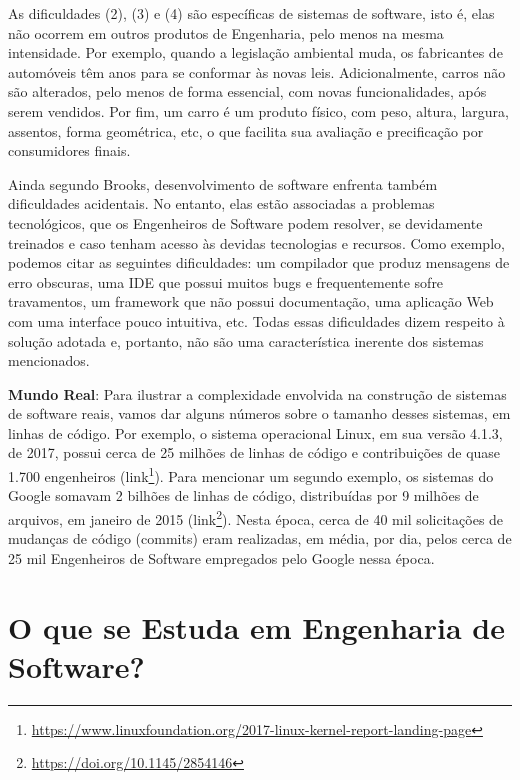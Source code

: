 \documentclass[
  11pt,
  twoside]{book}
\DeclareRobustCommand{\href}[2]{#2\footnote{\url{#1}}}
\newenvironment{esmbox}{\centering \vspace{1.5ex} \begin{tcolorbox}[breakable, colback=backcolor, width=4.9in]}{\end{tcolorbox} \vspace{1.5ex}}
\begin{document}
As dificuldades (2), (3) e (4) são específicas de sistemas de software,
isto é, elas não ocorrem em outros produtos de Engenharia, pelo menos na
mesma intensidade. Por exemplo, quando a legislação ambiental muda, os
fabricantes de automóveis têm anos para se conformar às novas leis.
Adicionalmente, carros não são alterados, pelo menos de forma essencial,
com novas funcionalidades, após serem vendidos. Por fim, um carro é um
produto físico, com peso, altura, largura, assentos, forma geométrica,
etc, o que facilita sua avaliação e precificação por consumidores
finais.

Ainda segundo Brooks, desenvolvimento de software enfrenta também
dificuldades acidentais. No entanto, elas estão associadas a problemas
tecnológicos, que os Engenheiros de Software podem resolver, se
devidamente treinados e caso tenham acesso às devidas tecnologias e
recursos. Como exemplo, podemos citar as seguintes dificuldades: um
compilador que produz mensagens de erro obscuras, uma IDE que possui
muitos bugs e frequentemente sofre travamentos, um framework que não
possui documentação, uma aplicação Web com uma interface pouco
intuitiva, etc. Todas essas dificuldades dizem respeito à solução
adotada e, portanto, não são uma característica inerente dos sistemas
mencionados.

 

\begin{esmbox}

\textbf{Mundo Real}: Para ilustrar a complexidade envolvida na
construção de sistemas de software reais, vamos dar alguns números sobre
o tamanho desses sistemas, em linhas de código. Por exemplo, o sistema
operacional Linux, em sua versão 4.1.3, de 2017, possui cerca de 25
milhões de linhas de código e contribuições de quase 1.700 engenheiros
(\href{https://www.linuxfoundation.org/2017-linux-kernel-report-landing-page}{link}).
Para mencionar um segundo exemplo, os sistemas do Google somavam 2
bilhões de linhas de código, distribuídas por 9 milhões de arquivos, em
janeiro de 2015 (\href{https://doi.org/10.1145/2854146}{link}). Nesta
época, cerca de 40 mil solicitações de mudanças de código (commits) eram
realizadas, em média, por dia, pelos cerca de 25 mil Engenheiros de
Software empregados pelo Google nessa época.

\end{esmbox}

\hypertarget{o-que-se-estuda-em-engenharia-de-software}{%
\section{O que se Estuda em Engenharia de
Software?}\label{o-que-se-estuda-em-engenharia-de-software}}
\end{document}
